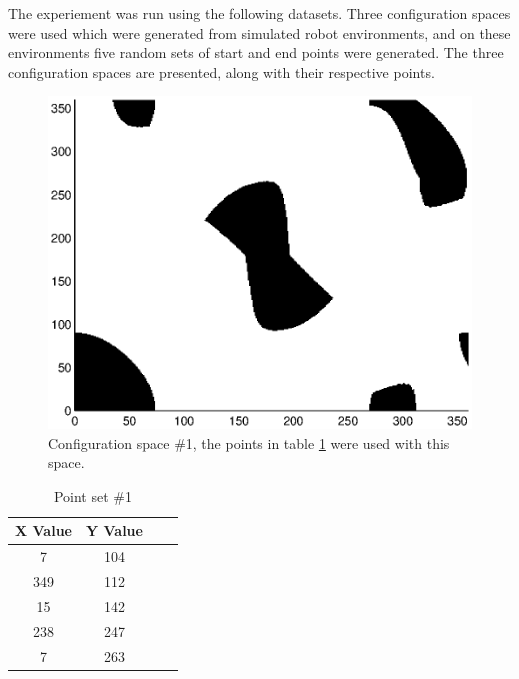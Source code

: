 The experiement was run using the following datasets. Three configuration spaces were used which were generated from simulated robot environments, and on these environments five random sets of start and end points were generated. The three configuration spaces are presented, along with their respective points.

\begin{figure}[h]
	\centering
	\includegraphics[width=\figWidth]{./figures/cspace2.eps}
	\caption{Configuration space \#1, the points in table \ref{tbl:pts1} were used with this space.}
	\label{fig:space1}
\end{figure}

\begin{table} [h]
\renewcommand{\arraystretch}{1.4}
	\caption{Point set \#1}
\label{tbl:pts1}
\begin{center}
		\begin{tabular}{ c | c  c  p{1.8cm} }
		X Value & Y Value \\ \hline
   7 &  104\\
   349 &  112\\
    15  & 142\\
   238   &247\\
     7   &263\\
\end{tabular}
\end{center}
\end{table}

